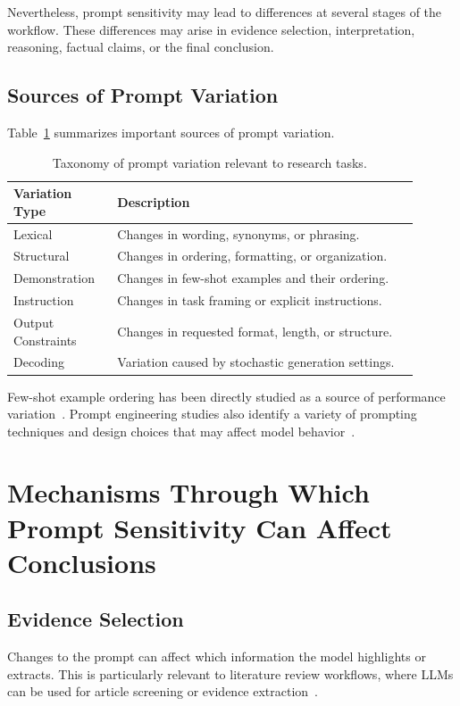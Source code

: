 \documentclass[acmsmall,screen,review]{acmart}
\begin{document}
Nevertheless, prompt sensitivity may lead to differences at several stages of the workflow. These differences may arise in evidence selection, interpretation, reasoning, factual claims, or the final conclusion.

\subsection{Sources of Prompt Variation}

Table~\ref{tab:prompt-taxonomy} summarizes important sources of prompt variation.

\begin{table}[t]
\caption{Taxonomy of prompt variation relevant to research tasks.}
\label{tab:prompt-taxonomy}
\centering
\begin{tabular}{p{0.23\linewidth}p{0.67\linewidth}}
\toprule
Variation Type & Description \\
\midrule
Lexical & Changes in wording, synonyms, or phrasing. \\
Structural & Changes in ordering, formatting, or organization. \\
Demonstration & Changes in few-shot examples and their ordering. \\
Instruction & Changes in task framing or explicit instructions. \\
Output Constraints & Changes in requested format, length, or structure. \\
Decoding & Variation caused by stochastic generation settings. \\
\bottomrule
\end{tabular}
\end{table}

Few-shot example ordering has been directly studied as a source of performance variation~\cite{lu2022}. Prompt engineering studies also identify a variety of prompting techniques and design choices that may affect model behavior~\cite{schulhoff2024}.

\section{Mechanisms Through Which Prompt Sensitivity Can Affect Conclusions}
\label{sec:mechanisms}

\subsection{Evidence Selection}

Changes to the prompt can affect which information the model highlights or extracts. This is particularly relevant to literature review workflows, where LLMs can be used for article screening or evidence extraction~\cite{han2025,strachan2024}.
\end{document}
